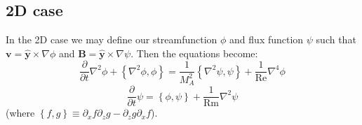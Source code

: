 \documentclass[aps,pop,preprint]{revtex4}
\begin{document}
	\subsection{2D case} \label{derivation:subsec:2d}
	In the 2D case we may define our streamfunction $\phi$ and flux function $\psi$ such that $\mathbf{v} = \hat{\mathbf{y}} \times \nabla \phi$ and $\mathbf{B} = \hat{\mathbf{y}} \times \nabla \psi$. 
	Then the equations become:
\begin{equation}
\frac{\partial}{\partial t} \nabla^2 \phi + \left\{\nabla^2 \phi, \phi \right\} = \frac{1}{M_A^2}\left\{\nabla^2 \psi, \psi \right\} + \frac{1}{\mathrm{Re}}\nabla^4 \phi
\end{equation}
\begin{equation}
\frac{\partial}{\partial t} \psi = \left\{ \phi, \psi \right\} + \frac{1}{\mathrm{Rm}}\nabla^2 \psi
\end{equation}
(where $\left\{f, g\right\} \equiv \partial_x f \partial_z g - \partial_z g \partial_x f$).
\end{document}
